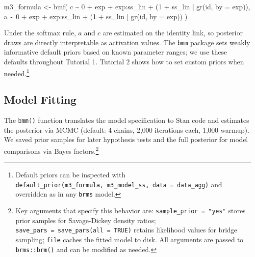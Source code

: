 \documentclass[
  man,
  floatsintext,
  longtable,
  nolmodern,
  notxfonts,
  notimes,
  colorlinks=true,linkcolor=blue,citecolor=blue,urlcolor=blue]{apa7}
\newenvironment{Shaded}{\begin{snugshade}}{\end{snugshade}}
\newcommand{\AttributeTok}[1]{\textcolor[rgb]{0.40,0.45,0.13}{#1}}
\newcommand{\DecValTok}[1]{\textcolor[rgb]{0.68,0.00,0.00}{#1}}
\newcommand{\FunctionTok}[1]{\textcolor[rgb]{0.28,0.35,0.67}{#1}}
\newcommand{\NormalTok}[1]{\textcolor[rgb]{0.00,0.23,0.31}{#1}}
\newcommand{\OtherTok}[1]{\textcolor[rgb]{0.00,0.23,0.31}{#1}}
\newcommand{\SpecialCharTok}[1]{\textcolor[rgb]{0.37,0.37,0.37}{#1}}
\begin{document}
\begin{Shaded}
\begin{Highlighting}[]
\NormalTok{m3\_formula }\OtherTok{\textless{}{-}} \FunctionTok{bmf}\NormalTok{(}
\NormalTok{  c }\SpecialCharTok{\textasciitilde{}} \DecValTok{0} \SpecialCharTok{+}\NormalTok{ exp }\SpecialCharTok{+}\NormalTok{ exp}\SpecialCharTok{:}\NormalTok{ss\_lin }\SpecialCharTok{+}\NormalTok{ (}\DecValTok{1} \SpecialCharTok{+}\NormalTok{ ss\_lin }\SpecialCharTok{|} \FunctionTok{gr}\NormalTok{(id, }\AttributeTok{by =}\NormalTok{ exp)),}
\NormalTok{  a }\SpecialCharTok{\textasciitilde{}} \DecValTok{0} \SpecialCharTok{+}\NormalTok{ exp }\SpecialCharTok{+}\NormalTok{ exp}\SpecialCharTok{:}\NormalTok{ss\_lin }\SpecialCharTok{+}\NormalTok{ (}\DecValTok{1} \SpecialCharTok{+}\NormalTok{ ss\_lin }\SpecialCharTok{|} \FunctionTok{gr}\NormalTok{(id, }\AttributeTok{by =}\NormalTok{ exp))}
\NormalTok{)}
\end{Highlighting}
\end{Shaded}

Under the softmax rule, \(a\) and \(c\) are estimated on the identity
link, so posterior draws are directly interpretable as activation
values. The \texttt{bmm} package sets weakly informative default priors
based on known parameter ranges; we use these defaults throughout
Tutorial 1. Tutorial 2 shows how to set custom priors when
needed.\footnote{Default priors can be inspected with
  \texttt{default\_prior(m3\_formula,\ m3\_model\_ss,\ data\ =\ data\_agg)}
  and overridden as in any \texttt{brms} model.}

\subsection{Model Fitting}\label{model-fitting}

The \texttt{bmm()} function translates the model specification to Stan
code and estimates the posterior via MCMC (default: 4 chains, 2,000
iterations each, 1,000 warmup). We saved prior samples for later
hypothesis tests and the full posterior for model comparisons via Bayes
factors.\footnote{Key arguments that specify this behavior are:
  \texttt{sample\_prior\ =\ "yes"} stores prior samples for
  Savage-Dickey density ratios;
  \texttt{save\_pars\ =\ save\_pars(all\ =\ TRUE)} retains likelihood
  values for bridge sampling; \texttt{file} caches the fitted model to
  disk. All arguments are passed to \texttt{brms::brm()} and can be
  modified as needed.}
\end{document}
